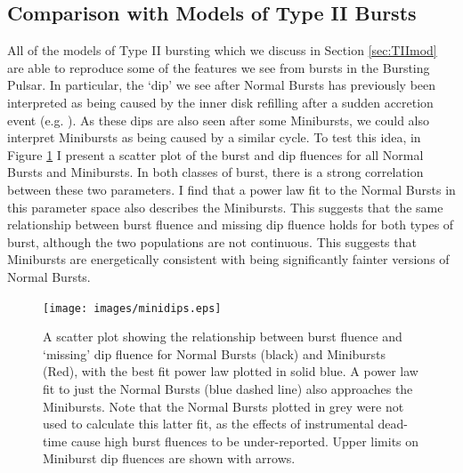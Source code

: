 \subsection{Comparison with Models of Type II Bursts}

\label{sec:mod}

\par All of the models of Type II bursting which we discuss in Section \ref{sec:TIImod} are able to reproduce some of the features we see from bursts in the Bursting Pulsar.  In particular, the `dip' we see after Normal Bursts has previously been interpreted as being caused by the inner disk refilling after a sudden accretion event (e.g. \citealp{Younes_Expo}).  \label{sec:Mini_Norm}As these dips are also seen after some Minibursts, we could also interpret Minibursts as being caused by a similar cycle.  To test this idea, in Figure \ref{fig:minidips} I present a scatter plot of the burst and dip fluences for all Normal Bursts and Minibursts.  In both classes of burst, there is a strong correlation between these two parameters.  I find that a power law fit to the Normal Bursts in this parameter space also describes the Minibursts.  This suggests that the same relationship between burst fluence and missing dip fluence holds for both types of burst, although the two populations are not continuous.  This suggests that Minibursts are energetically consistent with being significantly fainter versions of Normal Bursts.

\begin{figure}
  \centering
  \texttt{[image: images/minidips.eps]}
  \caption[A scatter plot showing the relationship between burst fluence and `missing' dip fluence for Normal Bursts and Minibursts.]{\small A scatter plot showing the relationship between burst fluence and `missing' dip fluence for Normal Bursts (black) and Minibursts (Red), with the best fit power law plotted in solid blue.  A power law fit to just the Normal Bursts (blue dashed line) also approaches the Minibursts.  Note that the Normal Bursts plotted in grey were not used to calculate this latter fit, as the effects of instrumental dead-time cause high burst fluences to be under-reported.  Upper limits on Miniburst dip fluences are shown with arrows.}
  \label{fig:minidips}
\end{figure}

